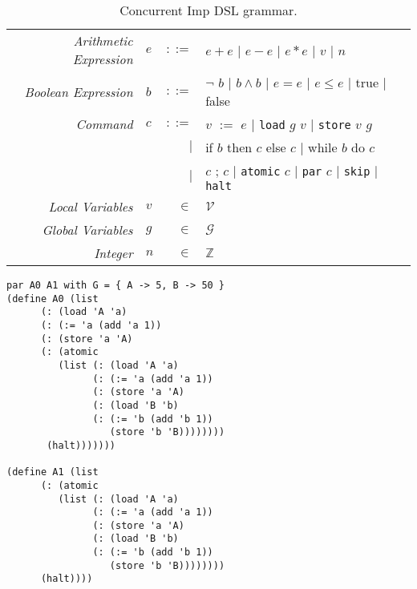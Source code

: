\begin{table*}[!htbp]
\centering
\begin{tabular}{ r l r l }
\emph{Arithmetic Expression} & $e$ & $::=$ & $e + e$ 
                                         $|$ $e - e$ 
                                         $|$ $e * e$ 
                                         $|$ $v$ 
                                         $|$ $n$ \\
\emph{Boolean Expression} & $b$ & $::=$ & $\neg$ $b$ 
                                      $|$ $b \wedge b$ 
                                      $|$ $e = e$ 
                                      $|$ $e \leq e$ 
                                      $|$ true 
                                      $|$ false \\
\emph{Command} & $c$ & $::=$ & $v$ $:=$ $e$ 
							 $|$   \texttt{load} $g$ $v$
							 $|$   \texttt{store} $v$ $g$ \\ 
               &     &       $|$ & if $b$ then $c$ else $c$
                             $|$   while $b$ do $c$ \\
               &     &       $|$ & $c$ ; $c$
							 $|$   \texttt{atomic} $c$
							 $|$   \texttt{par} $c$
							 $|$   \texttt{skip}
							 $|$   \texttt{halt} 
                               \\
\emph{Local Variables} & $v$ & $\in$ & $\mathcal{V}$ \\
\emph{Global Variables} & $g$ & $\in$ & $\mathcal{G}$ \\
\emph{Integer} & $n$ & $\in$ & $\mathbb{Z}$ \\
\end{tabular}
\caption{
Concurrent Imp DSL grammar. 
}
\label{tab:dsl}
\end{table*}

\begin{lstlisting}[caption={Two threads concurrently updating a global store (ConImp).},captionpos=b,frame=single]
par A0 A1 with G = { A -> 5, B -> 50 }  
(define A0 (list
      (: (load 'A 'a)
      (: (:= 'a (add 'a 1))
      (: (store 'a 'A)
      (: (atomic
         (list (: (load 'A 'a)
               (: (:= 'a (add 'a 1))
               (: (store 'a 'A)
               (: (load 'B 'b)
               (: (:= 'b (add 'b 1))
                  (store 'b 'B))))))))
       (halt)))))))

(define A1 (list
      (: (atomic
         (list (: (load 'A 'a)
               (: (:= 'a (add 'a 1))
               (: (store 'a 'A)
               (: (load 'B 'b)
               (: (:= 'b (add 'b 1))
                  (store 'b 'B))))))))
      (halt))))
  
\end{lstlisting}


